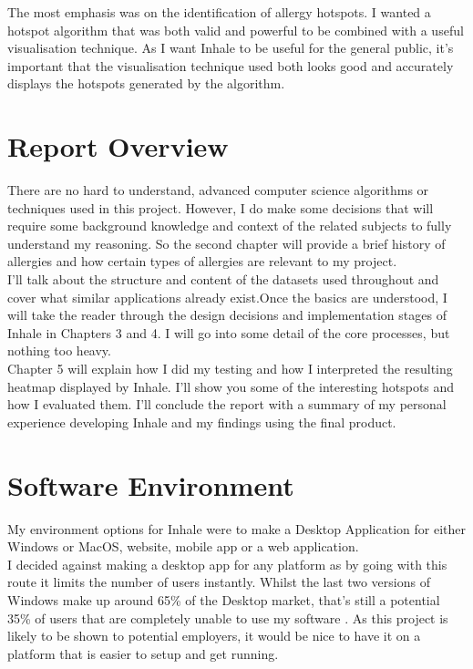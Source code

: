 The most emphasis was on the identification of allergy hotspots. I wanted a hotspot algorithm that was both valid and  powerful to be combined with a useful visualisation technique. As I want Inhale to be useful for the general public, it's important that the visualisation technique used both looks good and accurately displays the hotspots generated by the algorithm.\\


\section{Report Overview}

There are no hard to understand, advanced computer science algorithms or techniques used in this project. However, I do make some decisions that will require some background knowledge and context of the related subjects to fully understand my reasoning. So the second chapter will provide a brief history of allergies and how certain types of allergies are relevant to my project.\\

I'll talk about the structure and content of the datasets used throughout and cover what similar applications already exist.Once the basics are understood, I will take the reader through the design decisions and implementation stages of Inhale in Chapters 3 and 4. I will go into some detail of the core processes, but nothing too heavy.\\

Chapter 5 will explain how I did my testing and how I interpreted the resulting heatmap displayed by Inhale. I'll show you some of the interesting hotspots and how I evaluated them. I'll conclude the report with a summary of my personal experience developing Inhale and my findings using the final product.\\
    

\section{Software Environment}

My environment options for Inhale were to make a Desktop Application for either Windows or MacOS, website, mobile app or a web application.\\

I decided against making a desktop app for any platform as by going with this route it limits the number of users instantly. Whilst the last two versions of Windows make up around 65\% of the Desktop market, that's still a potential 35\% of users that are completely unable to use my software \cite{windows}. As this project is likely to be shown to potential employers, it would be nice to have it on a platform that is easier to setup and get running.\\

